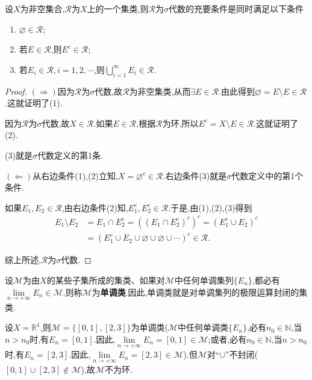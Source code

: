 \documentclass[../../main.tex]{subfiles}%
\begin{document}
\begin{theorem}\label{theorem:集合论--定理1.3.5}
设$X$为非空集合,$\mathscr{R}$为$X$上的一个集类,则$\mathscr{R}$为$\sigma$代数的充要条件是同时满足以下条件
\begin{enumerate}[(1)]
\item $\varnothing \in \mathscr{R}$;
\item 若$E \in \mathscr{R}$,则$E^c \in \mathscr{R}$;
\item 若$E_i \in \mathscr{R},i=1,2,\cdots$,则$\bigcup_{i=1}^{\infty} E_i \in \mathscr{R}$.
\end{enumerate}
\end{theorem}
\begin{proof}
$(\Rightarrow)$因为$\mathscr{R}$为$\sigma$代数,故$\mathscr{R}$为非空集类,从而$\exists E \in \mathscr{R}$.由此得到$\varnothing = E \setminus E \in \mathscr{R}$.这就证明了(1).

因为$\mathscr{R}$为$\sigma$代数,故$X \in \mathscr{R}$.如果$E \in \mathscr{R}$,根据$\mathscr{R}$为环,所以$E^c = X \setminus E \in \mathscr{R}$.这就证明了(2).

(3)就是$\sigma$代数定义的第1条.

$(\Leftarrow)$从右边条件(1),(2)立知,$X = \varnothing^c \in \mathscr{R}$.右边条件(3)就是$\sigma$代数定义中的第1个条件.

如果$E_1,E_2 \in \mathscr{R}$,由右边条件(2)知,$E_1^c,E_2^c \in \mathscr{R}$.于是,由(1),(2),(3)得到
\begin{align*}
E_1 \setminus E_2 &= E_1 \cap E_2^c = \left( (E_1 \cap E_2^c)^c \right)^c = \left( E_1^c \cup E_2 \right)^c \\
&= \left( E_1^c \cup E_2 \cup \varnothing \cup \varnothing \cup \cdots \right)^c \in \mathscr{R}.
\end{align*}

综上所述,$\mathscr{R}$为$\sigma$代数.
\end{proof}

\begin{definition}[单调类]
设$\mathscr{M}$为由$X$的某些子集所成的集类、如果对$\mathscr{M}$中任何单调集列$\{E_n\}$,都必有$\lim\limits_{n \to +\infty} E_n \in \mathscr{M}$,则称$\mathscr{M}$为\textbf{单调类}.因此,单调类就是对单调集列的极限运算封闭的集类.
\end{definition}

\begin{example}
设$X=\mathbb{R}^1$,则$\mathscr{M}=\{[0,1],[2,3]\}$为单调类($\mathscr{M}$中任何单调类$\{E_n\}$,必有$n_0 \in \mathbb{N}$,当$n>n_0$时,有$E_n=[0,1]$.因此,$\lim\limits_{n \to +\infty} E_n=[0,1] \in \mathscr{M}$;或者,必有$n_0 \in \mathbb{N}$,当$n>n_0$时,有$E_n=[2,3]$.因此,$\lim\limits_{n \to +\infty} E_n=[2,3] \in \mathscr{M}$).但$\mathscr{M}$对“$\cup$”不封闭($[0,1] \cup [2,3] \notin \mathscr{M}$),故$\mathscr{M}$不为环.
\end{example}
\end{document}
